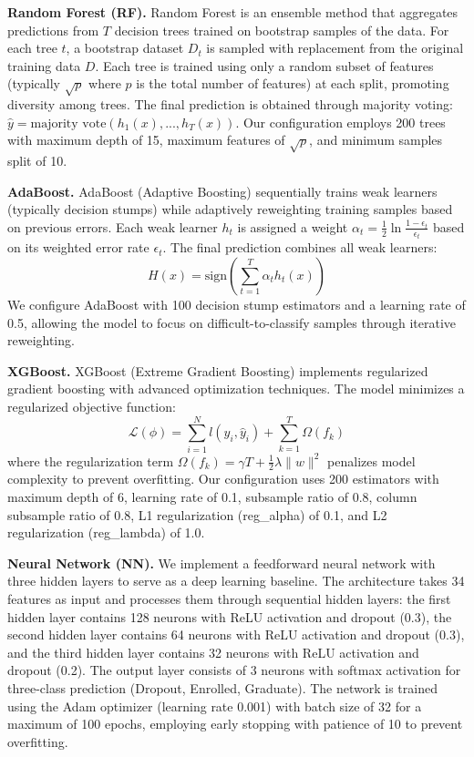 \documentclass[journal]{IEEEtran}
\begin{document}
\textbf{Random Forest (RF).} Random Forest is an ensemble method that aggregates predictions from $T$ decision trees trained on bootstrap samples of the data. For each tree $t$, a bootstrap dataset $D_t$ is sampled with replacement from the original training data $D$. Each tree is trained using only a random subset of features (typically $\sqrt{p}$ where $p$ is the total number of features) at each split, promoting diversity among trees. The final prediction is obtained through majority voting: $\hat{y} = \text{majority vote}(h_1(x), ..., h_T(x))$. Our configuration employs 200 trees with maximum depth of 15, maximum features of $\sqrt{p}$, and minimum samples split of 10.

\textbf{AdaBoost.} AdaBoost (Adaptive Boosting) sequentially trains weak learners (typically decision stumps) while adaptively reweighting training samples based on previous errors. Each weak learner $h_t$ is assigned a weight $\alpha_t = \frac{1}{2}\ln\frac{1-\epsilon_t}{\epsilon_t}$ based on its weighted error rate $\epsilon_t$. The final prediction combines all weak learners:
\begin{equation}
H(x) = \text{sign}\left(\sum_{t=1}^{T} \alpha_t h_t(x)\right)
\end{equation}
We configure AdaBoost with 100 decision stump estimators and a learning rate of 0.5, allowing the model to focus on difficult-to-classify samples through iterative reweighting.

\textbf{XGBoost.} XGBoost (Extreme Gradient Boosting) implements regularized gradient boosting with advanced optimization techniques. The model minimizes a regularized objective function:
\begin{equation}
\mathcal{L}(\phi) = \sum_{i=1}^{N} l(y_i, \hat{y}_i) + \sum_{k=1}^{T} \Omega(f_k)
\end{equation}
where the regularization term $\Omega(f_k) = \gamma T + \frac{1}{2}\lambda\|w\|^2$ penalizes model complexity to prevent overfitting. Our configuration uses 200 estimators with maximum depth of 6, learning rate of 0.1, subsample ratio of 0.8, column subsample ratio of 0.8, L1 regularization (reg\_alpha) of 0.1, and L2 regularization (reg\_lambda) of 1.0.

\textbf{Neural Network (NN).} We implement a feedforward neural network with three hidden layers to serve as a deep learning baseline. The architecture takes 34 features as input and processes them through sequential hidden layers: the first hidden layer contains 128 neurons with ReLU activation and dropout (0.3), the second hidden layer contains 64 neurons with ReLU activation and dropout (0.3), and the third hidden layer contains 32 neurons with ReLU activation and dropout (0.2). The output layer consists of 3 neurons with softmax activation for three-class prediction (Dropout, Enrolled, Graduate). The network is trained using the Adam optimizer (learning rate 0.001) with batch size of 32 for a maximum of 100 epochs, employing early stopping with patience of 10 to prevent overfitting.
\end{document}
